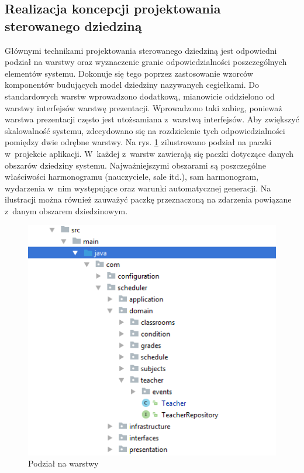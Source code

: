 \documentclass[a4paper]{book}
\begin{document}
{\subsection{Realizacja koncepcji projektowania sterowanego dziedziną}
Głównymi technikami projektowania sterowanego dziedziną jest odpowiedni podział na warstwy oraz wyznaczenie granic odpowiedzialności poszczególnych elementów systemu. Dokonuje się tego poprzez zastosowanie wzorców komponentów budujących model dziedziny nazywanych cegiełkami. Do standardowych warstw wprowadzono dodatkową, mianowicie oddzielono od warstwy interfejsów warstwę prezentacji. Wprowadzono taki zabieg, ponieważ warstwa prezentacji często jest utożsamiana z~warstwą interfejsów. Aby zwiększyć skalowalność systemu, zdecydowano się na rozdzielenie tych odpowiedzialności pomiędzy dwie odrębne warstwy. Na rys. \ref{id:fig:warstwy} zilustrowano podział na paczki w~projekcie aplikacji. W~każdej z~warstw zawierają się paczki dotyczące danych obszarów dziedziny systemu. Najważniejszymi obszarami są poszczególne właściwości harmonogramu (nauczyciele, sale itd.), sam harmonogram, wydarzenia w~nim występujące oraz warunki automatycznej generacji. Na ilustracji można również zauważyć paczkę przeznaczoną na zdarzenia powiązane z~danym obszarem dziedzinowym.
\begin{figure}
	\centering
	\includegraphics[height=0.4\textheight]{./img/strukturaDDD.png}
	\caption{Podział na warstwy}
	\label{id:fig:warstwy}
\end{figure}

}
\end{document}
